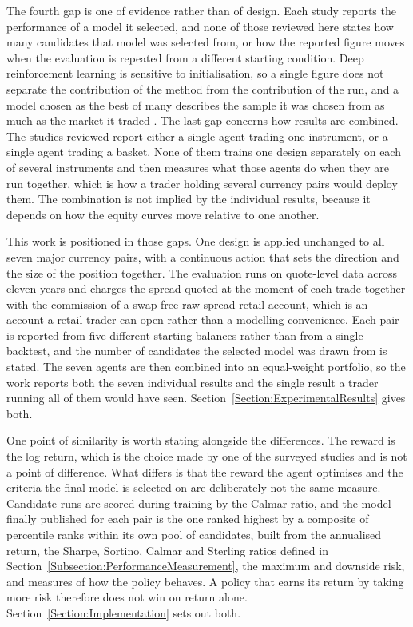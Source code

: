 The fourth gap is one of evidence rather than of design. Each study reports the performance of a model it selected, and none of those reviewed here states how many candidates that model was selected from, or how the reported figure moves when the evaluation is repeated from a different starting condition. Deep reinforcement learning is sensitive to initialisation, so a single figure does not separate the contribution of the method from the contribution of the run, and a model chosen as the best of many describes the sample it was chosen from as much as the market it traded \cite{bailey_pseudo-mathematics_2014, lopez_de_prado_advances_2018}. The last gap concerns how results are combined. The studies reviewed report either a single agent trading one instrument, or a single agent trading a basket. None of them trains one design separately on each of several instruments and then measures what those agents do when they are run together, which is how a trader holding several currency pairs would deploy them. The combination is not implied by the individual results, because it depends on how the equity curves move relative to one another.

This work is positioned in those gaps. One design is applied unchanged to all seven major currency pairs, with a continuous action that sets the direction and the size of the position together. The evaluation runs on quote-level data across eleven years and charges the spread quoted at the moment of each trade together with the commission of a swap-free raw-spread retail account, which is an account a retail trader can open rather than a modelling convenience. Each pair is reported from five different starting balances rather than from a single backtest, and the number of candidates the selected model was drawn from is stated. The seven agents are then combined into an equal-weight portfolio, so the work reports both the seven individual results and the single result a trader running all of them would have seen. Section~\ref{Section:ExperimentalResults} gives both.

One point of similarity is worth stating alongside the differences. The reward is the log return, which is the choice made by one of the surveyed studies \cite{majidi_algorithmic_2022} and is not a point of difference. What differs is that the reward the agent optimises and the criteria the final model is selected on are deliberately not the same measure. Candidate runs are scored during training by the Calmar ratio, and the model finally published for each pair is the one ranked highest by a composite of percentile ranks within its own pool of candidates, built from the annualised return, the Sharpe, Sortino, Calmar and Sterling ratios defined in Section~\ref{Subsection:PerformanceMeasurement}, the maximum and downside risk, and measures of how the policy behaves. A policy that earns its return by taking more risk therefore does not win on return alone. Section~\ref{Section:Implementation} sets out both.